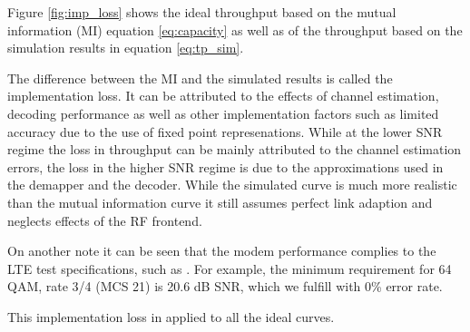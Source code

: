 \documentclass[a4paper,10pt]{article}
\begin{document}
Figure \ref{fig:imp_loss} shows the ideal throughput based on the mutual information (MI) equation \eqref{eq:capacity} as well as of the throughput based on the simulation results in equation \eqref{eq:tp_sim}. 

The difference between the MI and the simulated results is called the implementation loss. It can be attributed to the effects of channel estimation, decoding performance as well as other implementation factors such as limited accuracy due to the use of fixed point represenations. While at the lower SNR regime the loss in throughput can be mainly attributed to the channel estimation errors, the loss in the higher SNR regime is due to the approximations used in the demapper and the decoder. While the simulated curve is much more realistic than the mutual information curve it still assumes perfect link adaption and neglects effects of the RF frontend.

On another note it can be seen that the modem performance complies to the LTE test specifications, such as \cite{3GPPTS36.101}. For example, the minimum requirement for 64 QAM, rate 3/4 (MCS 21) is 20.6 dB SNR, which we fulfill with 0\% error rate.

This implementation loss in applied to all the ideal curves.
\end{document}
